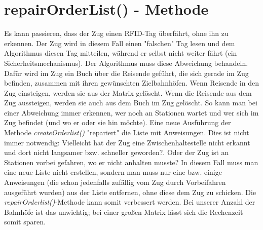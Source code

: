 \section{repairOrderList() - Methode}
Es kann passieren, dass der Zug einen RFID-Tag überfährt, ohne ihn zu erkennen. Der Zug wird in diesem Fall einen "falschen" Tag lesen und dem Algorithmus diesen Tag mitteilen, während er selbst nicht weiter fährt (ein Sicherheitsmechanismus). Der Algorithmus muss diese Abweichung behandeln. Dafür wird im Zug ein Buch über die Reisende geführt, die sich gerade im Zug befinden, zusammen mit ihren gewünschten Zielbahnhöfen. Wenn Reisende in den Zug einsteigen, werden sie aus der Matrix gelöscht. Wenn die Reisende aus dem Zug aussteigen, werden sie auch aus dem Buch im Zug gelöscht. So kann man bei einer Abweichung immer erkennen, wer noch an Stationen wartet und wer sich im Zug befindet (und wo er oder sie hin möchte). Eine neue Ausführung der Methode \textit{createOrderlist()} "repariert" die Liste mit Anweisungen. Dies ist nicht immer notwendig: Vielleicht hat der Zug eine Zwischenhaltestelle nicht erkannt und dort nicht langsamer bzw. schneller geworden?. Oder der Zug ist an Stationen vorbei gefahren, wo er nicht anhalten musste? In diesem Fall muss man eine neue Liste nicht erstellen, sondern man muss nur eine bzw. einige Anweisungen (die schon jedenfalls zufällig vom Zug durch Vorbeifahren ausgeführt wurden) aus der Liste entfernen, ohne diese dem Zug zu schicken. Die \textit{repairOrderlist()}-Methode kann somit verbessert werden. Bei unserer Anzahl der Bahnhöfe ist das unwichtig; bei einer großen Matrix lässt sich die Rechenzeit somit sparen.\\
%
%
%
%
